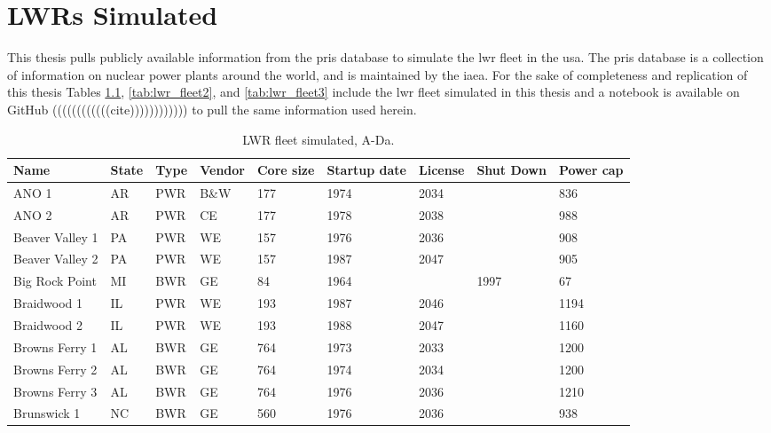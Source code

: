 \chapter{LWRs Simulated}
\label{app:lwrs}

This thesis pulls publicly available information from the \gls{pris} database \cite{IAEA_PRIS} to simulate the \gls{lwr} fleet in the \gls{usa}. The \gls{pris} database is a collection of information on nuclear power plants around the world, and is maintained by the \gls{iaea}. For the sake of completeness and replication of this thesis Tables \ref{tab:lwr_fleet_1}, \ref{tab:lwr_fleet2}, and \ref{tab:lwr_fleet3} include the \gls{lwr} fleet simulated in this thesis and a notebook is available on GitHub ((((((((((((cite)))))))))))) to pull the same information used herein.


\begin{table}[H]
    \centering
    \caption{LWR fleet simulated, A-Da.}
    \label{tab:lwr_fleet_1}
    \begin{tabular}{l l l l l l l l l}
    \hline
    \textbf{Name} & \textbf{State} & \textbf{Type} & \textbf{Vendor} & \textbf{Core size} & \textbf{Startup date} & \textbf{License} & \textbf{Shut Down} & \textbf{Power cap} \\
    \hline
    ANO 1                 &AR & PWR & B\&W & 177 & 1974 & 2034 &      & 836 \\
    ANO 2                 &AR & PWR & CE   & 177 & 1978 & 2038 &      & 988 \\
    Beaver Valley 1       &PA & PWR & WE   & 157 & 1976 & 2036 &      & 908 \\
    Beaver Valley 2       &PA & PWR & WE   & 157 & 1987 & 2047 &      & 905 \\
    Big Rock Point        &MI & BWR & GE   & 84  & 1964 &      & 1997 & 67  \\
    Braidwood 1           &IL & PWR & WE   & 193 & 1987 & 2046 &      & 1194\\
    Braidwood 2           &IL & PWR & WE   & 193 & 1988 & 2047 &      & 1160\\
    Browns Ferry 1        &AL & BWR & GE   & 764 & 1973 & 2033 &      & 1200\\
    Browns Ferry 2        &AL & BWR & GE   & 764 & 1974 & 2034 &      & 1200\\
    Browns Ferry 3        &AL & BWR & GE   & 764 & 1976 & 2036 &      & 1210\\
    Brunswick 1           &NC & BWR & GE   & 560 & 1976 & 2036 &      & 938 \\

\end{tabular}
\end{table}
